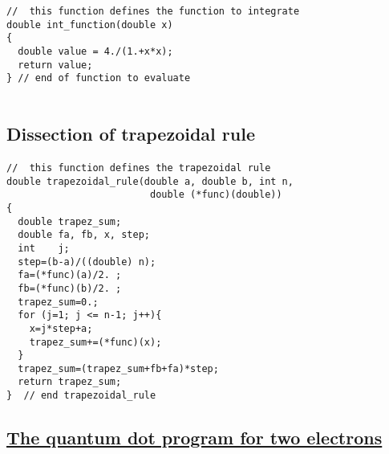 \documentclass[%
oneside,                 %
final,                   %
10pt]{article}
\begin{document}
\begin{verbatim}
//  this function defines the function to integrate
double int_function(double x)
{
  double value = 4./(1.+x*x);
  return value;
} // end of function to evaluate


\end{verbatim}



\subsection*{Dissection of trapezoidal rule}

\paragraph{}



















\begin{verbatim}
//  this function defines the trapezoidal rule
double trapezoidal_rule(double a, double b, int n, 
                         double (*func)(double))
{
  double trapez_sum;
  double fa, fb, x, step;
  int    j;
  step=(b-a)/((double) n);
  fa=(*func)(a)/2. ;
  fb=(*func)(b)/2. ;
  trapez_sum=0.;
  for (j=1; j <= n-1; j++){
    x=j*step+a;
    trapez_sum+=(*func)(x);
  }
  trapez_sum=(trapez_sum+fb+fa)*step;
  return trapez_sum;
}  // end trapezoidal_rule 

\end{verbatim}



\subsection*{\href{{https://github.com/CompPhysics/ComputationalPhysics2/blob/master/doc/Programs/ParallelizationMPI/MPIvmcqdot.cpp}}{The quantum dot program for two electrons}}
\end{document}
